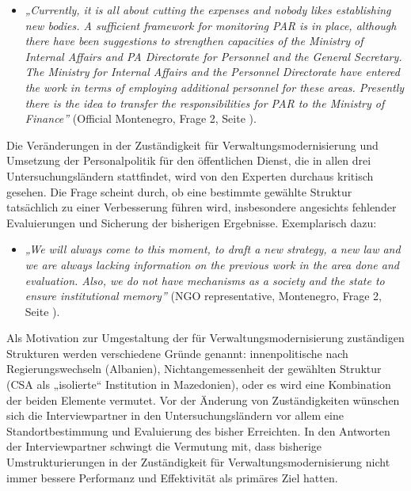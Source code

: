 \begin{itemize}[label={}]
\item \textit{„Currently, it is all about cutting the expenses and nobody likes establishing new bodies. A sufficient framework for monitoring PAR is in place, although there have been suggestions to strengthen capacities of the Ministry of Internal Affairs and PA Directorate for Personnel and the General Secretary. The Ministry for Internal Affairs and the Personnel Directorate have entered the work in terms of employing additional personnel for these areas. Presently there is the idea to transfer the responsibilities for PAR to the Ministry of Finance”} (Official Montenegro, Frage 2, Seite \pageref{sec:par ahead}).
\end{itemize}
Die Veränderungen in der Zuständigkeit für Verwaltungsmodernisierung und Umsetzung der Personalpolitik für den öffentlichen Dienst, die in allen drei Untersuchungsländern stattfindet, wird von den Experten durchaus kritisch gesehen. Die Frage scheint durch, ob eine bestimmte gewählte Struktur tatsächlich zu einer Verbesserung führen wird, insbesondere angesichts fehlender Evaluierungen und Sicherung der bisherigen Ergebnisse. Exemplarisch dazu: 
\begin{itemize}[label={}]
\item \textit{„We will always come to this moment, to draft a new strategy, a new law and we are always lacking information on the previous work in the area done and evaluation. Also, we do not have mechanisms as a society and the state to ensure institutional memory”} (NGO representative, Montenegro, Frage 2, Seite \pageref{sec:par ahead}).
\end{itemize}
Als Motivation zur Umgestaltung der für Verwaltungsmodernisierung zuständigen Strukturen werden verschiedene Gründe genannt: innenpolitische nach Regierungswechseln (Albanien), Nichtangemessenheit der gewählten Struktur (CSA als „isolierte“ Institution in Mazedonien), oder es wird eine Kombination der beiden Elemente vermutet. Vor der Änderung von Zuständigkeiten  wünschen sich die Interviewpartner in den Untersuchungsländern vor allem eine Standortbestimmung und Evaluierung des bisher Erreichten. In den Antworten der Interviewpartner schwingt die Vermutung mit, dass bisherige Umstrukturierungen in der Zuständigkeit für Verwaltungsmodernisierung nicht immer bessere Performanz und Effektivität als primäres Ziel hatten.
